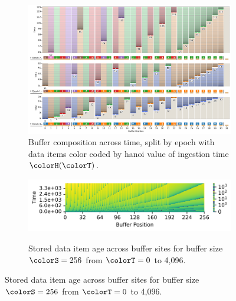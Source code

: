 \begin{figure}[h!]
  \centering

\begin{subfigure}[b]{\linewidth}
\includegraphics[width=\linewidth]{
binder/teeplots/11/num-generations=128+reservation-mode=steady+surface-size=32+viz=site-reservation-by-rank-spliced-at-heatmap+ext=}
\vspace{-4ex}\caption{
  Buffer composition across time, split by epoch with data items color coded by hanoi value of ingestion time $\colorH(\colorT)$.
}
\label{fig:hsurf-steady-implementation-schematic}
\end{subfigure}

\vspace{1ex}\begin{minipage}[]{\textwidth}
 \vspace{-2pt}
  \begin{subfigure}[t]{0.7\linewidth}
    \vspace{0pt}
    \centering
  \includegraphics[width=0.88\linewidth,clip]{binder/teeplots/11/cnorm=log+num-generations=4096+surface-size=256+viz=site-ingest-depth-by-rank-heatmap+ynorm=linear+ext=}
  \end{subfigure}%
  \begin{subfigure}[t]{0.3\linewidth}
  \vspace{-2pt}
  \caption{%
    Stored data item age across buffer sites for buffer size $\colorS=256$ from $\colorT=0$ to 4,096.
  }
  \label{fig:hsurf-steady-implementation-heatmap}
\end{subfigure}
\end{minipage}


\end{figure}
